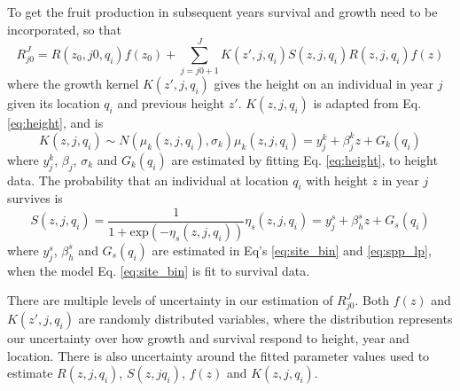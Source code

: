 \documentclass[12pt,a4paper]{article}
\begin{document}
To get the fruit production in subsequent years survival and growth need to be incorporated, so that 
\begin{equation}
	R_{j0}^J = R(z_0, j0, q_i)f(z_0) + \sum_{j = j0 + 1}^J K(z', j, q_i)S(z, j, q_i)R(z, j, q_i)f(z) 
\end{equation} 
where the growth kernel $K(z', j, q_i)$ gives the height on an individual in year $j$ given its location $q_i$ and previous height $z'$. $K(z, j, q_i)$ is adapted from Eq. \ref{eq:height}, and is 
\begin{subequations}
\label{eq:growth}
\begin{equation}
	K(z, j, q_i) \sim N(\mu_k(z, j, q_i), \sigma_k)
\end{equation}
\begin{equation}
	\mu_k(z, j, q_i) = y_j^k + \beta_j^k z + G_k(q_i)
\end{equation}
\end{subequations}
where $y_j^k$, $\beta_j$, $\sigma_k$ and $G_k(q_i)$ are estimated by fitting Eq. \ref{eq:height}, to height data. The probability that an individual at location $q_i$ with height $z$ in year $j$ survives is     
\begin{subequations}
\label{eq:survival}
\begin{equation}
	S(z, j, q_i) = \frac{1}{1 + \text{exp}(-\eta_s(z, j, q_i))}
\end{equation}
\begin{equation}
	\eta_s(z, j, q_i) = y_j^s + \beta_h^s z + G_s(q_i)
\end{equation}
\end{subequations}
where $y_j^s$, $\beta_h^s$ and $G_s(q_i)$ are estimated in Eq's \ref{eq:site_bin} and \ref{eq:spp_lp}, when the model Eq. \ref{eq:site_bin} is fit to survival data. 

There are multiple levels of uncertainty in our estimation of $R_{j0}^J$. Both $f(z)$  and $K(z', j, q_i)$ are randomly distributed variables, where the distribution represents our uncertainty over how growth and survival respond to height, year and location. There is also uncertainty around the fitted parameter values used to estimate $R(z, j, q_i)$, $S(z, j q_i)$, $f(z)$ and $K(z, j, q_i)$. 
\end{document}
